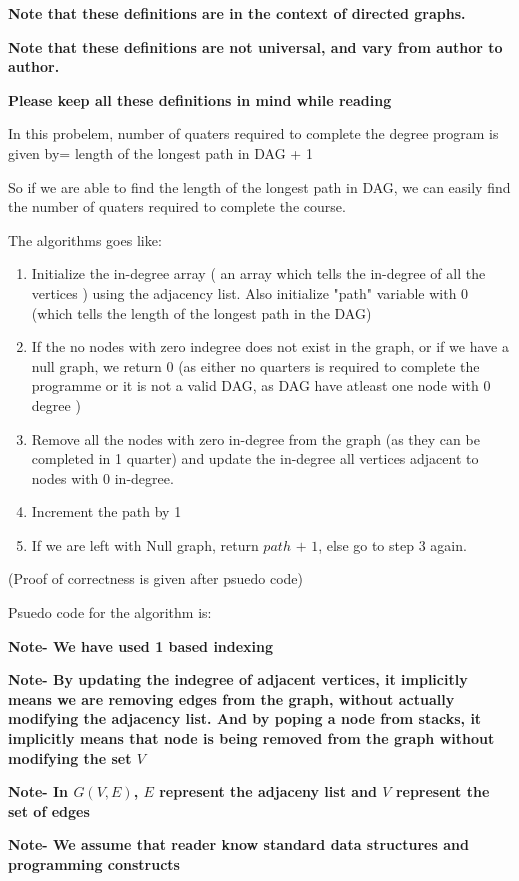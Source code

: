 \documentclass[answers]{exam}
\begin{document}
\begin{questions}
\begin{solution}
\textbf{Note that these definitions are in the context of directed graphs.}\par
\textbf{Note that these definitions are not universal, and vary from author to author.}\par
\textbf{Please keep all these definitions in mind while reading}



In this probelem, number of quaters required to complete the degree program is given by= length of the longest path in DAG + 1

So if we are able to find the length of the longest path in DAG, we can easily find the number of quaters required to complete the course.




The algorithms goes like:
\begin{enumerate}
    \item Initialize the in-degree array ( an array which tells the in-degree of all the vertices ) using the adjacency list. Also initialize "path" variable with $0$ (which tells the length of the longest path in the DAG)
    \item If the no nodes with zero indegree does not exist in the graph, or if we have a null graph, we return $0$ (as either no quarters is required to complete the programme or it is not a valid DAG, as DAG have atleast one node with $0$ degree ) 
    \item Remove all the nodes with zero in-degree from the graph (as they can be completed in 1 quarter) and update the in-degree all vertices adjacent to nodes with $0$ in-degree.
    \item Increment the path by 1
    \item If we are left with Null graph, return $path$ $+$ $1$, else go to step 3 again. 
\end{enumerate}

(Proof of correctness is given after psuedo code)

Psuedo code for the algorithm is:
\par
\textbf{Note- We have used 1 based indexing }
\par
\textbf{Note- By updating the indegree of adjacent vertices, it implicitly means we are removing  edges from the graph, without actually modifying the adjacency list. And by poping a node from stacks, it implicitly means that node is being removed from the graph without modifying the set $V$}
\par
\textbf{Note- In $G(V,E)$, $E$ represent the adjaceny list and $V$ represent the set of edges}
\par
\textbf{Note- We assume that reader know standard data structures and programming constructs}
\par



\end{solution}
\end{questions}
\end{document}
